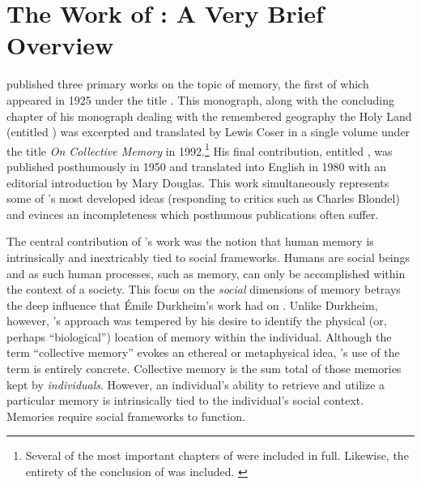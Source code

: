 
\section{The Work of \Halbwachs: A Very Brief Overview}

\halbwachs published three primary works on the topic of memory, the first of which appeared in 1925 under the title .\autocite{halbwachs1925} This monograph, along with the concluding chapter of his monograph dealing with the remembered geography the Holy Land (entitled ) was excerpted and translated by Lewis Coser in a single volume under the title \emph{On Collective Memory} in 1992.\footnote{Several of the most important chapters of  were included in full. Likewise, the entirety of the conclusion of  was included. \autocites{halbwachs1992}{halbwachs1941}} His final contribution, entitled , was published posthumously in 1950 and translated into English in 1980 with an editorial introduction by Mary Douglas.\autocite{halbwachs1980} This work simultaneously represents some of \halbwachs's most developed ideas (responding to critics such as Charles Blondel) and evinces an incompleteness which posthumous publications often suffer.\autocites{halbwachs1980}[As Coser observes, ``One may doubt that the author himself would have been willing to publish it in what seems to be an unfinished state. The book nevertheless contains many further developments of \halbwachs's thought in regard to such matters as the relation of space and time to collective memory as well as fruitful definitions and applications of the differences between individual, collective, and historical memory.''][2]{coser_halbwachs1992}  

The central contribution of \halbwachs's work was the notion that human memory is intrinsically and inextricably tied to social frameworks. Humans are social beings and as such human processes, such as memory, can only be accomplished within the context of a society. This focus on the \emph{social} dimensions of memory betrays the deep influence that Émile Durkheim's work had on \halbwachs. Unlike Durkheim, however, \halbwachs's approach was tempered by his desire to identify the physical (or, perhaps ``biological'') location of memory within the individual. Although the term ``collective memory'' evokes an ethereal or metaphysical idea, \halbwachs's use of the term is entirely concrete. Collective memory is the sum total of those memories kept by \emph{individuals}. However, an individual's ability to retrieve and utilize a particular memory is intrinsically tied to the individual's social context. Memories require social frameworks to function.\autocite[38]{halbwachs1992}  

